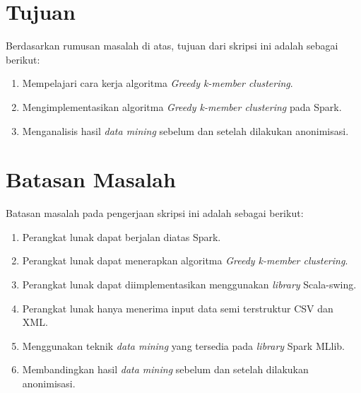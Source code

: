 \newpage
\section{Tujuan}
\label{sec:tujuan}
Berdasarkan rumusan masalah di atas, tujuan dari skripsi ini adalah sebagai berikut:
\begin{enumerate}
\item Mempelajari cara kerja algoritma {\it Greedy k-member clustering}.
\item Mengimplementasikan algoritma {\it Greedy k-member clustering } pada Spark.
\item Menganalisis hasil {\it data mining} sebelum dan setelah dilakukan anonimisasi.
\end{enumerate}

\section{Batasan Masalah}
\label{sec:batasan}
Batasan masalah pada pengerjaan skripsi ini adalah sebagai berikut:
\begin{enumerate}
\item Perangkat lunak dapat berjalan diatas Spark.
\item Perangkat lunak dapat menerapkan algoritma {\it Greedy k-member clustering}.
\item Perangkat lunak dapat diimplementasikan menggunakan {\it library} Scala-swing.
\item Perangkat lunak hanya menerima input data semi terstruktur CSV dan XML.
\item Menggunakan teknik {\it data mining} yang tersedia pada {\it library} Spark MLlib.
\item Membandingkan hasil {\it data mining} sebelum dan setelah dilakukan anonimisasi.
\end{enumerate}

